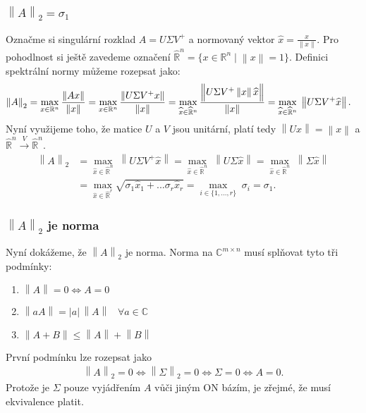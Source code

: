 \documentclass[]{article}
\newcommand{\R}{\mathbb{R}}
\renewcommand{\C}{\mathbb{C}}
\newcommand{\norm}[1]{\left\lVert#1\right\rVert}
\newcommand{\x}{\times}
\DeclarePairedDelimiter\nnorm{\lVert}{\rVert}
\begin{document}
\subsubsection[normajesigma]{$\norm{A}_2 = \sigma_1$}
Označme si singulární rozklad $A = U \Sigma V^+$ a normovaný vektor $\widehat{x} = \frac{x}{\norm{x}}$. Pro pohodlnost si ještě zavedeme označení $\widehat{\R}^n = \big\{ x \in \R^n \; \big| \; \norm{x} = 1\big\}$. Definici spektrální normy můžeme rozepsat jako:
\begin{align*}
  \norm{A}_2
  &= \max_{x \in \R^n} \frac{\norm{Ax}}{\norm{x}}
  = \max_{x \in \R^n} \frac{\norm{U \Sigma V^+ x}}{\norm{x}}
  = \max_{\widehat{x} \in \widehat{\R}^n} \frac{\nnorm[\Big]{U \Sigma V^+ \norm{x} \widehat{x}}}{\norm{x}}
  = \max_{\widehat{x} \in \widehat{\R}^n} \; \norm{U \Sigma V^+ \widehat{x}}.
\end{align*}
Nyní využijeme toho, že matice $U$ a $V$ jsou unitární, platí tedy $\norm{Ux} = \norm{x}$ a  $\widehat{\R}^n \xrightarrow{\;V\;} \widehat{\R}^n$.
\begin{align*}
  \norm{A}_2
  &= \max_{\widehat{x} \in \widehat{\R}^n} \; \norm{U \Sigma V^+ \widehat{x}}
  = \max_{\widehat{x} \in \widehat{\R}^n} \; \norm{U \Sigma \widehat{x}}
  = \max_{\widehat{x} \in \widehat{\R}^n} \; \norm{\Sigma \widehat{x}}
  \\
  &= \max_{\widehat{x} \in \widehat{\R}^r} \sqrt{\sigma_1 \widehat{x}_1 + ... \sigma_r \widehat{x}_r}
  = \max_{i \in \{1, ..., r\}} \; \sigma_i
  = \sigma_1.
\end{align*}

\subsubsection[jetonorma]{$\norm{A}_2$ je norma}
Nyní dokážeme, že $\norm{A}_2$ je norma. Norma na $\C^{m \x n}$ musí splňovat tyto tři podmínky:
\begin{enumerate}
  \item $\norm{A} = 0 \iff A = 0$
  \item $\norm{aA} = |a| \, \norm{A} \;\;\; \forall a \in \mathbb{C}$
  \item $\norm{A + B} \leq \norm{A} + \norm{B}$
\end{enumerate}
První podmínku lze rozepsat jako
\begin{align*}
  \norm{A}_2 = 0 \iff \norm{\Sigma}_2 = 0 \iff \Sigma = 0 \iff A = 0.
\end{align*}
Protože je $\Sigma$ pouze vyjádřením $A$ vůči jiným ON bázím, je zřejmé, že musí ekvivalence platit.
\end{document}
